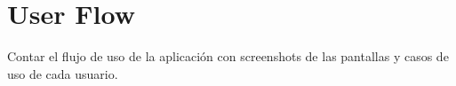\chapter{User Flow}
\label{cp:user-flow}

\parindent0pt

Contar el flujo de uso de la aplicación con screenshots de las pantallas y casos de uso de cada usuario. 
